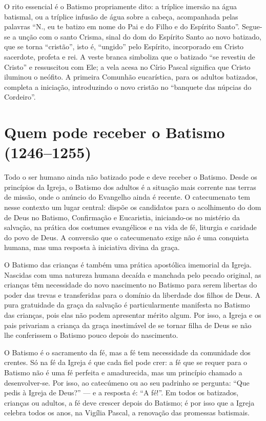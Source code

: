 O rito essencial é o Batismo propriamente dito: a tríplice imersão na água batismal, ou a tríplice infusão de água sobre a cabeça, acompanhada pelas palavras ``N., eu te batizo em nome do Pai e do Filho e do Espírito Santo''. Segue-se a unção com o santo Crisma, sinal do dom do Espírito Santo ao novo batizado, que se torna ``cristão'', isto é, ``ungido'' pelo Espírito, incorporado em Cristo sacerdote, profeta e rei. A veste branca simboliza que o batizado ``se revestiu de Cristo'' e ressuscitou com Ele; a vela acesa no Círio Pascal significa que Cristo iluminou o neófito. A primeira Comunhão eucarística, para os adultos batizados, completa a iniciação, introduzindo o novo cristão no ``banquete das núpcias do Cordeiro''.

\section{Quem pode receber o Batismo (1246--1255)}

Todo o ser humano ainda não batizado pode e deve receber o Batismo. Desde os princípios da Igreja, o Batismo dos adultos é a situação mais corrente nas terras de missão, onde o anúncio do Evangelho ainda é recente. O catecumenato tem nesse contexto um lugar central: dispõe os candidatos para o acolhimento do dom de Deus no Batismo, Confirmação e Eucaristia, iniciando-os no mistério da salvação, na prática dos costumes evangélicos e na vida de fé, liturgia e caridade do povo de Deus. A conversão que o catecumenato exige não é uma conquista humana, mas uma resposta à iniciativa divina da graça.

O Batismo das crianças é também uma prática apostólica imemorial da Igreja. Nascidas com uma natureza humana decaída e manchada pelo pecado original, as crianças têm necessidade do novo nascimento no Batismo para serem libertas do poder das trevas e transferidas para o domínio da liberdade dos filhos de Deus. A pura gratuidade da graça da salvação é particularmente manifesta no Batismo das crianças, pois elas não podem apresentar mérito algum. Por isso, a Igreja e os pais privariam a criança da graça inestimável de se tornar filha de Deus se não lhe conferissem o Batismo pouco depois do nascimento.

O Batismo é o sacramento da fé, mas a fé tem necessidade da comunidade dos crentes. Só na fé da Igreja é que cada fiel pode crer: a fé que se requer para o Batismo não é uma fé perfeita e amadurecida, mas um princípio chamado a desenvolver-se. Por isso, ao catecúmeno ou ao seu padrinho se pergunta: ``Que pedis à Igreja de Deus?'' --- e a resposta é: ``A fé!''. Em todos os batizados, crianças ou adultos, a fé deve crescer depois do Batismo; é por isso que a Igreja celebra todos os anos, na Vigília Pascal, a renovação das promessas batismais.

